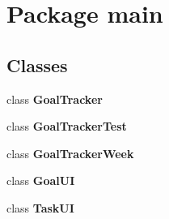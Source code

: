 \section{Package main}
\label{namespacemain}
\subsection*{Classes}
\begin{DoxyCompactItemize}
\item 
class \textbf{ Goal\+Tracker}
\item 
class \textbf{ Goal\+Tracker\+Test}
\item 
class \textbf{ Goal\+Tracker\+Week}
\item 
class \textbf{ Goal\+UI}
\item 
class \textbf{ Task\+UI}
\end{DoxyCompactItemize}
